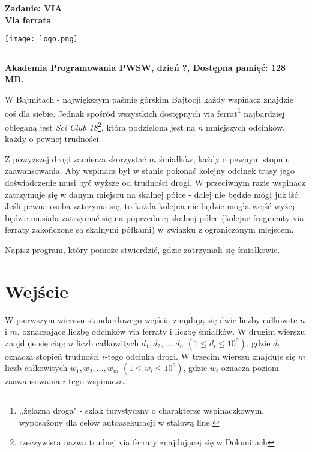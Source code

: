 \documentclass[10pt]{article}
\begin{document}
    

    \noindent
    \begin{minipage}{0.5\textwidth}
        \LARGE{\textsf{\textbf{Zadanie: VIA\\Via ferrata}}}
    \end{minipage}
    \begin{minipage}{0.5\textwidth}
        \begin{flushright}
            \texttt{[image: logo.png]}
        \end{flushright}
    \end{minipage}
    
    \noindent\rule{\textwidth}{0.4pt}
    
    \noindent\textbf{Akademia Programowania PWSW, dzień ?, Dostępna pamięć: 128 MB.}
    \vspace{1em}
    
    
    \noindent
    W Bajmitach - największym paśmie górskim Bajtocji każdy wspinacz znajdzie coś dla siebie. Jednak spośród wszystkich dostępnych via ferrat\footnote{,,żelazna droga" - szlak turystyczny o charakterze wspinaczkowym, wyposażony dla celów autoasekuracji w stalową linę.} najbardziej obleganą jest \textit{Sci Club 18}\footnote{rzeczywista nazwa trudnej via ferraty znajdującej się w Dolomitach}, która podzielona jest na $n$ mniejszych odcinków, każdy o pewnej trudności. 

    Z powyższej drogi zamierza skorzystać $m$ śmiałków, każdy o pewnym stopniu zaawansowania. Aby wspinacz był w stanie pokonać kolejny odcinek trasy jego doświadczenie musi być wyższe od trudności drogi. W przeciwnym razie wspinacz zatrzymuje się w danym miejscu na skalnej półce - dalej nie będzie mógł już iść. Jeśli pewna osoba zatrzyma się, to każda kolejna nie będzie mogła wejść wyżej - będzie musiała zatrzymać się na poprzedniej skalnej półce (kolejne fragmenty via ferraty zakończone są skalnymi półkami) w związku z ograniczonym miejscem.

    Napisz program, który pomoże stwierdzić, gdzie zatrzymali się śmiałkowie.


    \section*{Wejście}
    
    W pierwszym wierszu standardowego wejścia znajdują się dwie liczby całkowite $n$ i $m$, oznaczające liczbę odcinków via ferraty i liczbę śmiałków. W drugim wierszu znajduje się ciąg $n$ liczb całkowitych $d_{1}, d_{2}, \ldots, d_{n}$ $(1 \leq d_{i} \leq 10^{9})$, gdzie $d_{i}$ oznacza stopień trudności $i$-tego odcinka drogi. W trzecim wierszu znajduje się $m$ liczb całkowitych $w_{1}, w_{2}, \ldots, w_{m}$ $(1 \leq w_{i} \leq 10^{9})$, gdzie $w_{i}$ oznacza poziom zaawansowania $i$-tego wspinacza.
\end{document}

